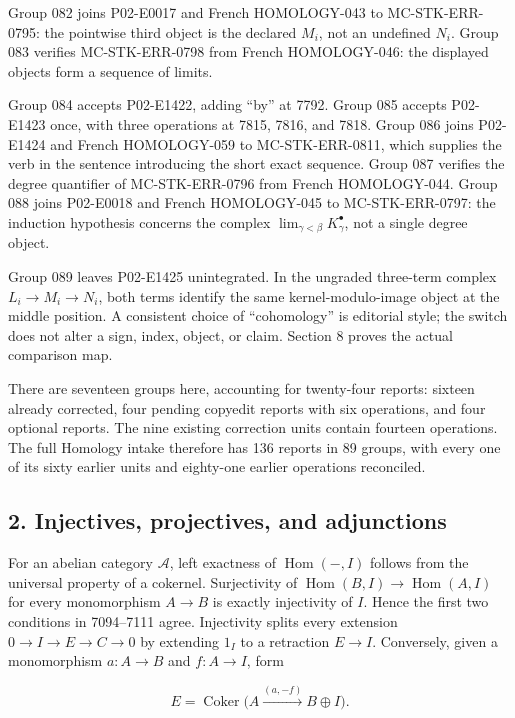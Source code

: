\documentclass[11pt]{article}
\begin{document}
Group 082 joins P02-E0017 and French HOMOLOGY-043 to MC-STK-ERR-0795: the pointwise third object is the declared \(M_i\), not an undefined \(N_i\). Group 083 verifies MC-STK-ERR-0798 from French HOMOLOGY-046: the displayed objects form a sequence of limits.

Group 084 accepts P02-E1422, adding ``by'' at 7792. Group 085 accepts P02-E1423 once, with three operations at 7815, 7816, and 7818. Group 086 joins P02-E1424 and French HOMOLOGY-059 to MC-STK-ERR-0811, which supplies the verb in the sentence introducing the short exact sequence. Group 087 verifies the degree quantifier of MC-STK-ERR-0796 from French HOMOLOGY-044. Group 088 joins P02-E0018 and French HOMOLOGY-045 to MC-STK-ERR-0797: the induction hypothesis concerns the complex \(\lim_{\gamma<\beta}K_\gamma^\bullet\), not a single degree object.

Group 089 leaves P02-E1425 unintegrated. In the ungraded three-term complex \(L_i\to M_i\to N_i\), both terms identify the same kernel-modulo-image object at the middle position. A consistent choice of ``cohomology'' is editorial style; the switch does not alter a sign, index, object, or claim. Section 8 proves the actual comparison map.

There are seventeen groups here, accounting for twenty-four reports: sixteen already corrected, four pending copyedit reports with six operations, and four optional reports. The nine existing correction units contain fourteen operations. The full Homology intake therefore has 136 reports in 89 groups, with every one of its sixty earlier units and eighty-one earlier operations reconciled.

\subsection{2. Injectives, projectives, and adjunctions}\label{note-09-injectives-projectives-and-adjunctions}

For an abelian category \(\mathcal A\), left exactness of \(\operatorname{Hom}(-,I)\) follows from the universal property of a cokernel. Surjectivity of \(\operatorname{Hom}(B,I)\to\operatorname{Hom}(A,I)\) for every monomorphism \(A\to B\) is exactly injectivity of \(I\). Hence the first two conditions in 7094--7111 agree. Injectivity splits every extension \(0\to I\to E\to C\to0\) by extending \(1_I\) to a retraction \(E\to I\). Conversely, given a monomorphism \(a:A\to B\) and \(f:A\to I\), form

\[
E=\operatorname{Coker}\bigl(A\xrightarrow{(a,-f)}B\oplus I\bigr).
\]
\end{document}
